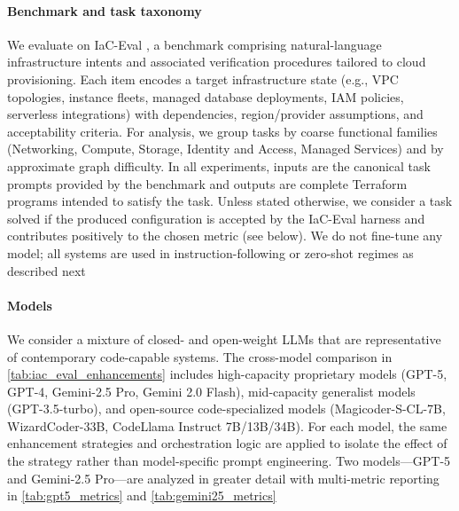 \documentclass[acmsmall,screen,review,anonymous]{acmart}
\begin{document}
\paragraph{Benchmark and task taxonomy}
We evaluate on IaC-Eval \cite{kon2024iac}, a benchmark comprising natural-language infrastructure intents and associated verification procedures tailored to cloud provisioning. Each item encodes a target infrastructure state (e.g., VPC topologies, instance fleets, managed database deployments, IAM policies, serverless integrations) with dependencies, region/provider assumptions, and acceptability criteria. For analysis, we group tasks by coarse functional families (Networking, Compute, Storage, Identity and Access, Managed Services) and by approximate graph difficulty. In all experiments, inputs are the canonical task prompts provided by the benchmark and outputs are complete Terraform programs intended to satisfy the task. Unless stated otherwise, we consider a task solved if the produced configuration is accepted by the IaC-Eval harness and contributes positively to the chosen metric (see below). We do not fine-tune any model; all systems are used in instruction-following or zero-shot regimes as described next

\paragraph{Models}
We consider a mixture of closed- and open-weight LLMs that are representative of contemporary code-capable systems. The cross-model comparison in \autoref{tab:iac_eval_enhancements} includes high-capacity proprietary models \cite{openai2022introducing} \cite{team2023gemini} (GPT-5, GPT-4, Gemini-2.5 Pro, Gemini 2.0 Flash), mid-capacity generalist models (GPT-3.5-turbo), and open-source code-specialized models (Magicoder-S-CL-7B, WizardCoder-33B, CodeLlama Instruct 7B/13B/34B). For each model, the same enhancement strategies and orchestration logic are applied to isolate the effect of the strategy rather than model-specific prompt engineering. Two models—GPT-5 and Gemini-2.5 Pro—are analyzed in greater detail with multi-metric reporting in \autoref{tab:gpt5_metrics} and \autoref{tab:gemini25_metrics}
\end{document}
